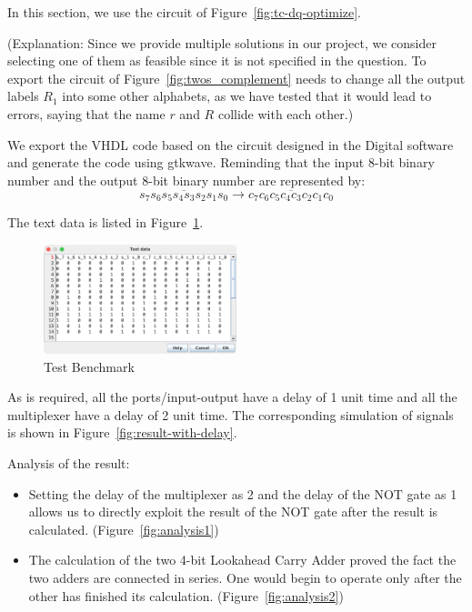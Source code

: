 \documentclass[conference]{IEEEtran}
\begin{document}
In this section, we use the circuit of Figure~\ref{fig:tc-dq-optimize}.

(Explanation: Since we provide multiple solutions in our project, we consider selecting one of them as feasible since it is not specified in the question. To export the circuit of Figure~\ref{fig:twos_complement} needs to change all
the output labels $R_1$ into some other alphabets, as we have tested that it would lead to errors, saying that the name $r$ and $R$ collide with each other.)

We export the VHDL code based on the circuit designed in the Digital software and generate the code using gtkwave.
Reminding that the input 8-bit binary number and the output 8-bit binary number are represented by:
\begin{equation}
    \overline{s_7s_6s_5s_4s_3s_2s_1s_0} \longrightarrow \overline{c_7c_6c_5c_4c_3c_2c_1c_0}
\end{equation}


The text data is listed in Figure~\ref{fig:test-benchmark}.

\begin{figure}[h!]
    \centering
    \includegraphics[width=0.5\textwidth]{assets/test-data.png}
    \caption{Test Benchmark}
    \label{fig:test-benchmark}
\end{figure}


As is required, all the ports/input-output have a delay of 1 unit time and all the multiplexer have a delay of 2 unit time.
The corresponding simulation of signals is shown in Figure~\ref{fig:result-with-delay}.


Analysis of the result:
\begin{itemize}
    \item Setting the delay of the multiplexer as 2 and the delay of the NOT gate as 1 allows us to directly exploit the result of the NOT gate after the result is calculated. (Figure~\ref{fig:analysis1})
    \item The calculation of the two 4-bit Lookahead Carry Adder proved the fact the two adders are connected in series. One would begin to operate only after the other has finished its calculation. (Figure~\ref{fig:analysis2})
\end{itemize}
\end{document}
